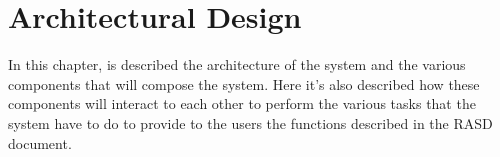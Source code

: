 \documentclass[../../dd.tex]{subfiles}
\begin{document}
	\chapter{Architectural Design}
		In this chapter, is described the architecture of the system and the various components that will compose the system.
		Here it's also described how these components will interact to each other to perform the various tasks that the system have to do to provide to the users the functions described in the RASD document.

		

		

		

		

		

		

		

		
\end{document}
